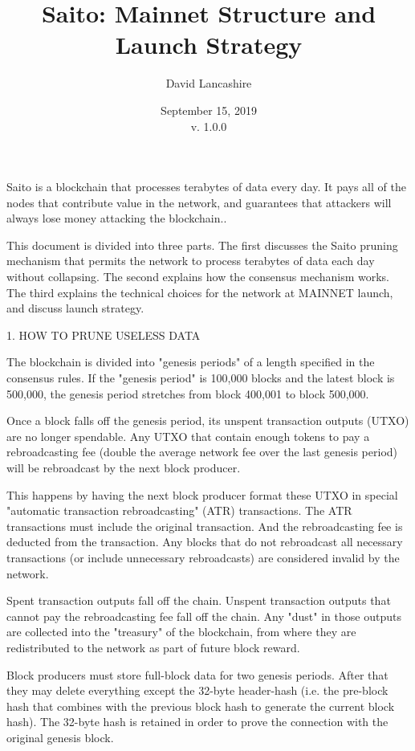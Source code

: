 \documentclass[11.5pt, oneside]{article}   	%
\title{Saito: Mainnet Structure and Launch Strategy}
\author{David Lancashire}
\date{September 15, 2019\\v. 1.0.0}
\begin{document}
\maketitle



\begin{onecolabstract}
Saito is a blockchain that processes terabytes of data every day. It pays all of the nodes that contribute value in the network, and guarantees that attackers will always lose money attacking the blockchain..
\end{onecolabstract}


\begin{multicols}{2}
This document is divided into three parts. The first discusses the Saito pruning mechanism that permits the network to process terabytes of data each day without collapsing. The second explains how the consensus mechanism works. The third explains the technical choices for the network at MAINNET launch, and discuss launch strategy.


1. HOW TO PRUNE USELESS DATA

The blockchain is divided into "genesis periods" of a length specified in the consensus rules. If the "genesis period" is 100,000 blocks and the latest block is 500,000, the genesis period stretches from block 400,001 to block 500,000.

Once a block falls off the genesis period, its unspent transaction outputs (UTXO) are no longer spendable. Any UTXO that contain enough tokens to pay a rebroadcasting fee (double the average network fee over the last genesis period) will be rebroadcast by the next block producer.

This happens by having the next block producer format these UTXO in special "automatic transaction rebroadcasting" (ATR) transactions. The ATR transactions must include the original transaction. And the rebroadcasting fee is deducted from the transaction. Any blocks that do not rebroadcast all necessary transactions (or include unnecessary rebroadcasts) are considered invalid by the network.

Spent transaction outputs fall off the chain. Unspent transaction outputs that cannot pay the rebroadcasting fee fall off the chain. Any "dust" in those outputs are collected into the "treasury" of the blockchain, from where they are redistributed to the network as part of future block reward.

Block producers must store full-block data for two genesis periods. After that they may delete everything except the 32-byte header-hash (i.e. the pre-block hash that combines with the previous block hash to generate the current block hash). The 32-byte hash is retained in order to prove the connection with the original genesis block.



\end{multicols}
\end{document}
